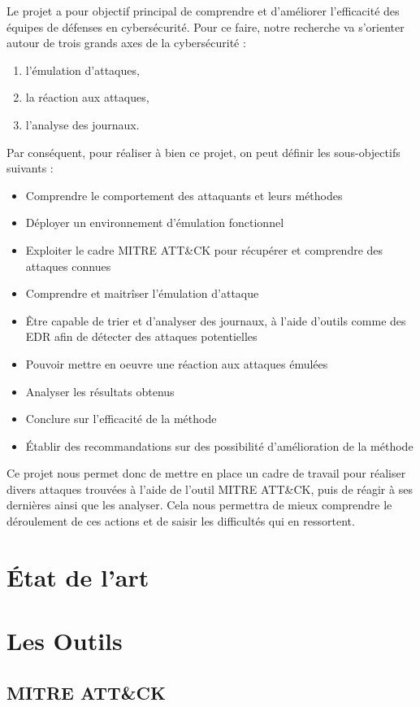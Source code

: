 \documentclass[12pt,letterpaper]{article}
\begin{document}
Le projet a pour objectif principal de comprendre et d'améliorer l'efficacité des équipes de défenses en cybersécurité. Pour ce faire, notre recherche va s'orienter autour de trois grands axes de la cybersécurité :  
\begin{enumerate}
    \item l'émulation d'attaques,
    \item la réaction aux attaques,
    \item l'analyse des journaux.
\end{enumerate}
Par conséquent, pour réaliser à bien ce projet, on peut définir les sous-objectifs suivants :
\begin{itemize}
    \item Comprendre le comportement des attaquants et leurs méthodes
    \item Déployer un environnement d'émulation fonctionnel
    \item Exploiter le cadre MITRE ATT\&CK pour récupérer et comprendre des attaques connues
    \item Comprendre et maitrîser l'émulation d'attaque
    \item Être capable de trier et d'analyser des journaux, à l'aide d'outils comme des EDR afin de détecter des attaques potentielles
    \item Pouvoir mettre en oeuvre une réaction aux attaques émulées
    \item Analyser les résultats obtenus
    \item Conclure sur l'efficacité de la méthode
    \item Établir des recommandations sur des possibilité d'amélioration de la méthode
\end{itemize}

Ce projet nous permet donc de mettre en place un cadre de travail pour réaliser divers attaques trouvées à l'aide de l'outil MITRE ATT\&CK, puis de réagir à ses dernières ainsi que les analyser.
Cela nous permettra de mieux comprendre le déroulement de ces actions et de saisir les difficultés qui en ressortent.

\newpage
\section{État de l'art}
\section{Les Outils}

\subsection{MITRE ATT\&CK}
\end{document}
